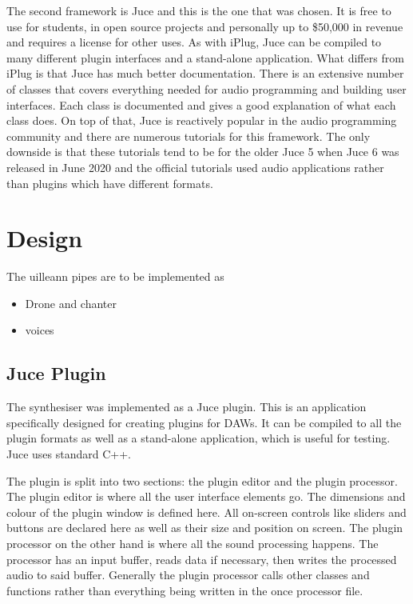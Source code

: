 \documentclass[12pt]{article}
\begin{document}
	The second framework is Juce and this is the one that was chosen. It is free to use for students, in open source projects and personally up to \$50,000 in revenue and 
	requires a license for other uses.
	As with iPlug, Juce can be compiled to many different plugin interfaces and a stand-alone application. What differs from iPlug is that Juce has much better documentation.
	There is an extensive number of classes that covers everything needed for audio programming and building user interfaces. 
	Each class is documented and gives a good explanation of what each class does. On top of that, Juce is reactively popular in the audio programming community and there
	are numerous tutorials for this framework. The only downside is that these tutorials tend to be for the older Juce 5 when Juce 6 was released in June 2020 and the official
	tutorials used audio applications rather than plugins which have different formats.
	

	
\section{Design}
	
	The uilleann pipes are to be implemented as
	
	\begin{itemize}
		\item Drone and chanter
		\item voices
	\end{itemize}
	
	
	\subsection{Juce Plugin}
	The synthesiser was implemented as a Juce plugin. This is an application specifically designed for creating plugins for DAWs. 
	It can be compiled to all the plugin formats as well as a stand-alone application, which is useful for testing. Juce uses standard C++.
	
	The plugin is split into two sections: the plugin editor and the plugin processor. The plugin editor is where all the user interface elements go. 
	The dimensions and colour of the plugin window is defined here. All on-screen controls like sliders and buttons are declared here as well as their size and position on screen.
	The plugin processor on the other hand is where all the sound processing happens. The processor has an input buffer, reads data if necessary, then writes the processed
	audio to said buffer. Generally the plugin processor calls other classes and functions rather than everything being written in the once processor file.
		
\end{document}
